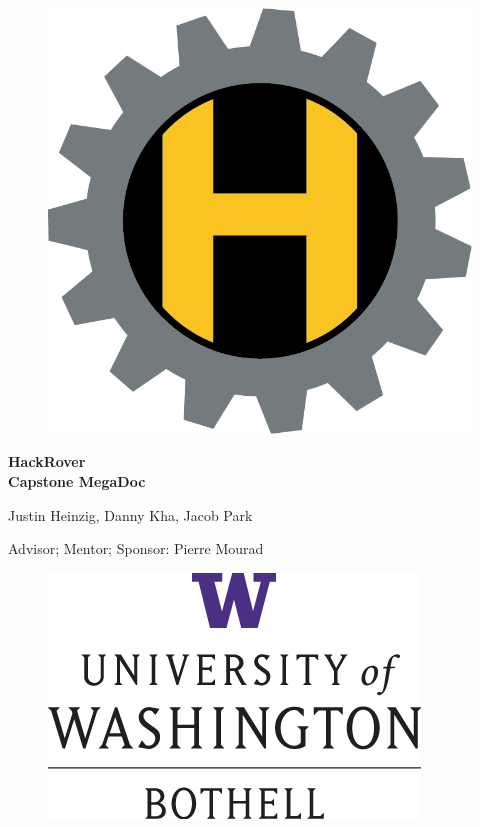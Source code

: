 \documentclass[a4paper, 10pt]{article}
\begin{document}
\begin{titlepage}

	\begin{figure}[h]
		\centering
		\includegraphics[scale=.8]{Photos/HackRoverlogolofi}
	\end{figure}

	\begin{center}
		\vspace*{1cm}
	
		\Huge
		\textbf{HackRover}\\[10pt]
	
	
		\large
		\textbf{Capstone MegaDoc}\\[40pt]

		\begin{changemargin}{10pt}{10pt} 
		\begin{center}
		\normalsize
		Justin Heinzig, Danny Kha, Jacob Park
	
		Advisor; Mentor; Sponsor: Pierre Mourad\\[150pt]
		\end{center}
		\end{changemargin}
	\end{center}
	
	\begin{figure}[h]
		\centering
		\includegraphics[scale=.8]{Photos/UWLogo}
	\end{figure}		
	

\end{titlepage}
\end{document}
